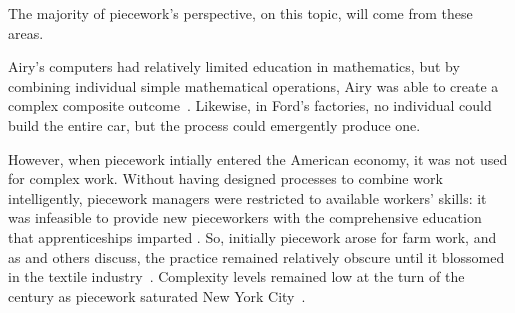 \documentclass[trackingWork]{subfiles}
\begin{document}


The majority of piecework's perspective, on this topic, will come from these areas.

Airy's computers had relatively limited education in mathematics, but by combining individual simple mathematical operations, Airy was able to create a complex composite outcome~\cite{grier2013computers}.
Likewise, in Ford's factories, no individual could build the entire car, but the process could emergently produce one.

However, when piecework intially entered the American economy,
it was not used for complex work.
Without having designed processes to combine work intelligently, piecework managers were restricted to available workers' skills: it was infeasible to provide new pieceworkers with the comprehensive education
that apprenticeships imparted \cite{hart2013rise}.
So, initially piecework arose for farm work, and as
\citeauthor{hughRaynbirdTaskWork} and others discuss,
the practice remained relatively obscure until
it blossomed in the textile industry~\cite{hughRaynbirdTaskWork}.
Complexity levels remained low at the turn of
the  century as piecework saturated New York City~\cite{riisOtherSideLives}.
\end{document}
